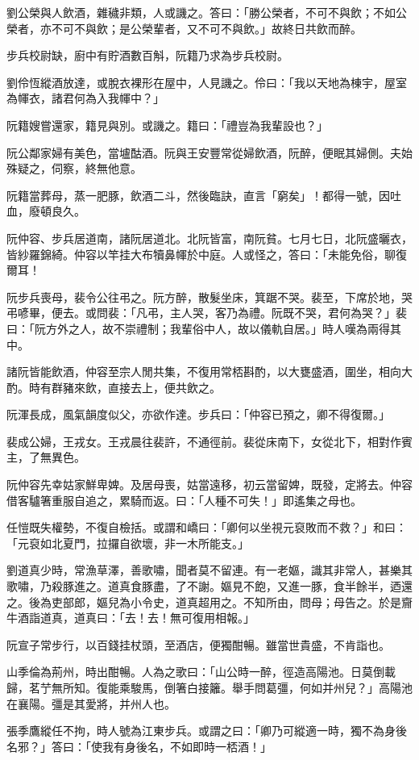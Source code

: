 劉公榮與人飲酒，雜穢非類，人或譏之。答曰：「勝公榮者，不可不與飲；不如公榮者，亦不可不與飲；是公榮輩者，又不可不與飲。」故終日共飲而醉。

步兵校尉缺，廚中有貯酒數百斛，阮籍乃求為步兵校尉。

劉伶恆縱酒放達，或脫衣裸形在屋中，人見譏之。伶曰：「我以天地為棟宇，屋室為㡓衣，諸君何為入我㡓中？」

阮籍嫂嘗還家，籍見與別。或譏之。籍曰：「禮豈為我輩設也？」

阮公鄰家婦有美色，當壚酤酒。阮與王安豐常從婦飲酒，阮醉，便眠其婦側。夫始殊疑之，伺察，終無他意。

阮籍當葬母，蒸一肥豚，飲酒二斗，然後臨訣，直言「窮矣」！都得一號，因吐血，廢頓良久。

阮仲容、步兵居道南，諸阮居道北。北阮皆富，南阮貧。七月七日，北阮盛曬衣，皆紗羅錦綺。仲容以竿挂大布犢鼻㡓於中庭。人或怪之，答曰：「未能免俗，聊復爾耳！

阮步兵喪母，裴令公往弔之。阮方醉，散髮坐床，箕踞不哭。裴至，下席於地，哭弔喭畢，便去。或問裴：「凡弔，主人哭，客乃為禮。阮既不哭，君何為哭？」裴曰：「阮方外之人，故不崇禮制；我輩俗中人，故以儀軌自居。」時人嘆為兩得其中。

諸阮皆能飲酒，仲容至宗人閒共集，不復用常桮斟酌，以大甕盛酒，圍坐，相向大酌。時有群豬來飲，直接去上，便共飲之。

阮渾長成，風氣韻度似父，亦欲作達。步兵曰：「仲容已預之，卿不得復爾。」

裴成公婦，王戎女。王戎晨往裴許，不通徑前。裴從床南下，女從北下，相對作賓主，了無異色。

阮仲容先幸姑家鮮卑婢。及居母喪，姑當遠移，初云當留婢，既發，定將去。仲容借客驢箸重服自追之，累騎而返。曰：「人種不可失！」即遙集之母也。

任愷既失權勢，不復自檢括。或謂和嶠曰：「卿何以坐視元裒敗而不救？」和曰：「元裒如北夏門，拉攞自欲壞，非一木所能支。」

劉道真少時，常漁草澤，善歌嘯，聞者莫不留連。有一老嫗，識其非常人，甚樂其歌嘯，乃殺豚進之。道真食豚盡，了不謝。嫗見不飽，又進一豚，食半餘半，迺還之。後為吏部郎，嫗兒為小令史，道真超用之。不知所由，問母；母告之。於是齎牛酒詣道真，道真曰：「去！去！無可復用相報。」

阮宣子常步行，以百錢挂杖頭，至酒店，便獨酣暢。雖當世貴盛，不肯詣也。

山季倫為荊州，時出酣暢。人為之歌曰：「山公時一醉，徑造高陽池。日莫倒載歸，茗艼無所知。復能乘駿馬，倒箸白接籬。舉手問葛彊，何如并州兒？」高陽池在襄陽。彊是其愛將，并州人也。

張季鷹縱任不拘，時人號為江東步兵。或謂之曰：「卿乃可縱適一時，獨不為身後名邪？」答曰：「使我有身後名，不如即時一桮酒！」

